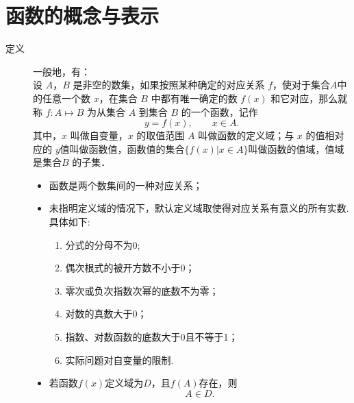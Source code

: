 \section{函数的概念与表示}
  \begin{description}
    \item [定义] 一般地，有：\\
      设 $A$，$B$ 是非空的数集，如果按照某种确定的对应关系 $f$，使对于集合$A$中的任意一个数 $x$，在集合 $B$ 中都有唯一确定的数 $f(x)$ 和它对应，那么就称 $f: A\mapsto B$ 为从集合 $A$ 到集合 $B$ 的一个函数，记作
      $$y=f(x),\qquad x\in A.$$
      其中，$x$ 叫做自变量，$x$ 的取值范围 $A$ 叫做函数的定义域；与 $x$ 的值相对应的 $y $值叫做函数值，函数值的集合$\{f(x)|x\in A\}$叫做函数的值域，值域是集合$B$ 的子集．
      \begin{itemize}[leftmargin=*]
        \kaishu
        \item 函数是两个数集间的一种对应关系；
        \item 未指明定义域的情况下，默认定义域取使得对应关系有意义的所有实数. 具体如下:
        \begin{enumerate}[label=\circled{\arabic*}]
          \item 分式的分母不为0;
          \item 偶次根式的被开方数不小于0；
          \item 零次或负次指数次幂的底数不为零；
          \item 对数的真数大于0；
          \item 指数、对数函数的底数大于0且不等于1；
          \item 实际问题对自变量的限制.
        \end{enumerate}
        \item 若函数$f(x)$定义域为$D$，且$f(A)$存在，则$$A\in D.$$
      \end{itemize}
  \end{description}

